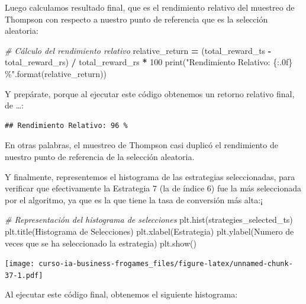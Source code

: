 \documentclass[
]{book}
\newenvironment{Shaded}{\begin{snugshade}}{\end{snugshade}}
\newcommand{\BuiltInTok}[1]{#1}
\newcommand{\CommentTok}[1]{\textcolor[rgb]{0.56,0.35,0.01}{\textit{#1}}}
\newcommand{\DecValTok}[1]{\textcolor[rgb]{0.00,0.00,0.81}{#1}}
\newcommand{\NormalTok}[1]{#1}
\newcommand{\OperatorTok}[1]{\textcolor[rgb]{0.81,0.36,0.00}{\textbf{#1}}}
\newcommand{\SpecialCharTok}[1]{\textcolor[rgb]{0.00,0.00,0.00}{#1}}
\newcommand{\StringTok}[1]{\textcolor[rgb]{0.31,0.60,0.02}{#1}}
\begin{document}
Luego calculamos resultado final, que es el rendimiento relativo del muestreo de Thompson con respecto a nuestro punto de referencia que es la selección aleatoria:

\begin{Shaded}
\begin{Highlighting}[]
\CommentTok{\# Cálculo del rendimiento relativo}
\NormalTok{relative\_return }\OperatorTok{=}\NormalTok{ (total\_reward\_ts }\OperatorTok{{-}}\NormalTok{ total\_reward\_rs) }\OperatorTok{/}\NormalTok{ total\_reward\_rs }\OperatorTok{*} \DecValTok{100}
\BuiltInTok{print}\NormalTok{(}\StringTok{"Rendimiento Relativo: }\SpecialCharTok{\{:.0f\}}\StringTok{ \%"}\NormalTok{.}\BuiltInTok{format}\NormalTok{(relative\_return))}
\end{Highlighting}
\end{Shaded}

Y prepárate, porque al ejecutar este código obtenemos un retorno relativo final, de \ldots:

\begin{verbatim}
## Rendimiento Relativo: 96 %
\end{verbatim}

En otras palabras, el muestreo de Thompson casi duplicó el rendimiento de nuestro punto de referencia de la selección aleatoria.

Y finalmente, representemos el histograma de las estrategias seleccionadas, para verificar que efectivamente la Estrategia 7 (la de índice 6) fue la más seleccionada por el algoritmo, ya que es la que tiene la tasa de conversión más alta:¡

\begin{Shaded}
\begin{Highlighting}[]
\CommentTok{\# Representación del histograma de selecciones}
\NormalTok{plt.hist(strategies\_selected\_ts)}
\NormalTok{plt.title(}\StringTok{\textquotesingle{}Histograma de Selecciones\textquotesingle{}}\NormalTok{)}
\NormalTok{plt.xlabel(}\StringTok{\textquotesingle{}Estrategia\textquotesingle{}}\NormalTok{)}
\NormalTok{plt.ylabel(}\StringTok{\textquotesingle{}Numero de veces que se ha seleccionado la estrategia\textquotesingle{}}\NormalTok{)}
\NormalTok{plt.show()}
\end{Highlighting}
\end{Shaded}

\texttt{[image: curso-ia-business-frogames\_files/figure-latex/unnamed-chunk-37-1.pdf]}

Al ejecutar este código final, obtenemos el siguiente histograma:
\end{document}

